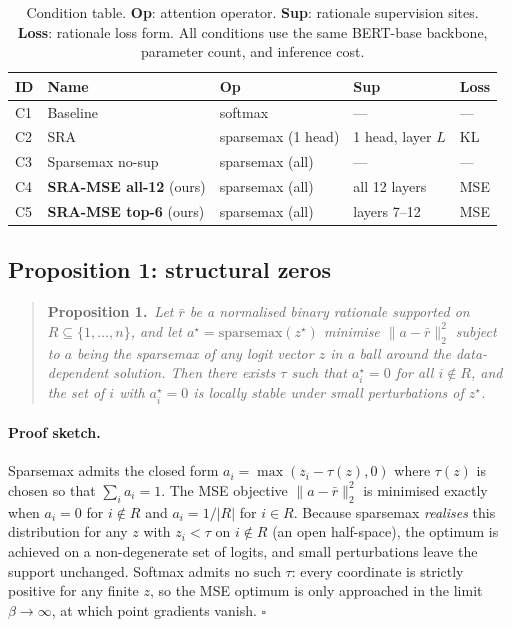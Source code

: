 \documentclass{article}
\begin{document}
\begin{table}[t]
\centering
\caption{Condition table. \textbf{Op}: attention operator. \textbf{Sup}: rationale
supervision sites. \textbf{Loss}: rationale loss form. All conditions use the same BERT-base
backbone, parameter count, and inference cost.}
\label{tab:conditions}
\small
\begin{tabular}{lllll}
\toprule
\textbf{ID} & \textbf{Name} & \textbf{Op} & \textbf{Sup} & \textbf{Loss} \\
\midrule
C1 & Baseline           & softmax    & ---           & ---  \\
C2 & SRA \citep{eilertsen2025aligning} & sparsemax (1 head) & 1 head, layer $L$ & KL \\
C3 & Sparsemax no-sup   & sparsemax (all)  & ---           & ---  \\
C4 & \textbf{SRA-MSE all-12} (ours) & sparsemax (all)  & all 12 layers & MSE \\
C5 & \textbf{SRA-MSE top-6} (ours)  & sparsemax (all)  & layers 7--12 & MSE \\
\bottomrule
\end{tabular}
\end{table}

\subsection{Proposition 1: structural zeros}
\label{sec:proposition}

\begin{quote}
\textbf{Proposition 1.}\ \emph{Let $\bar r$ be a normalised binary rationale supported on
$R \subseteq \{1,\dots,n\}$, and let $a^\star = \mathrm{sparsemax}(z^\star)$ minimise
$\|a - \bar r\|_2^2$ subject to $a$ being the sparsemax of any logit vector $z$ in a ball
around the data-dependent solution. Then there exists $\tau$ such that $a^\star_i = 0$
for all $i \notin R$, and the set of $i$ with $a^\star_i = 0$ is locally stable under
small perturbations of $z^\star$.}
\end{quote}

\paragraph{Proof sketch.}
Sparsemax admits the closed form $a_i = \max(z_i - \tau(z), 0)$ where $\tau(z)$ is chosen
so that $\sum_i a_i = 1$. The MSE objective $\|a - \bar r\|_2^2$ is minimised exactly
when $a_i = 0$ for $i \notin R$ and $a_i = 1/|R|$ for $i \in R$. Because sparsemax
\emph{realises} this distribution for any $z$ with $z_i < \tau$ on $i \notin R$ (an open
half-space), the optimum is achieved on a non-degenerate set of logits, and small
perturbations leave the support unchanged. Softmax admits no such $\tau$: every coordinate
is strictly positive for any finite $z$, so the MSE optimum is only approached in the
limit $\beta \to \infty$, at which point gradients vanish. \hfill$\square$
\end{document}
